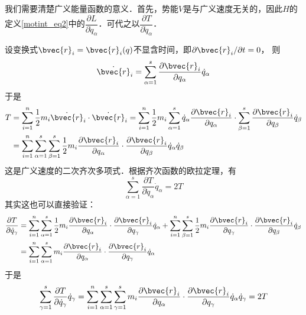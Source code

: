 我们需要清楚广义能量函数的意义．首先，势能$V$是与广义速度无关的，因此$H$的定义\autoref{motint_eq2}中的$\dfrac{\partial L}{\partial \dot q_\alpha}$．可代之以$\dfrac{\partial T}{\partial \dot q_\alpha}$．

设变换式$\bvec{r}_{i}=\bvec{r}_{i}(q)$不显含时间，即$\partial \bvec{r}_{i} / \partial t=0$， 则
\begin{equation}
\dot{\bvec{r}}_{i}=\sum_{\alpha=1}^{s} \frac{\partial \bvec{r}_{i}}{\partial q_{\alpha}} \dot{q}_{\alpha}
\end{equation}
于是
\begin{equation}
\begin{aligned} T &=\sum_{i=1}^{n} \frac{1}{2} m_{i} \dot{\bvec{r}}_{i} \cdot \dot{\bvec{r}}_{i}=\sum_{i=1}^{n} \frac{1}{2} m_{i} \sum_{\alpha=1}^{s} \dot{q}_{\alpha} \frac{\partial \bvec{r}_{i}}{\partial q_{\alpha}} \cdot \sum_{\beta=1}^{s} \frac{\partial \bvec{r}_{i}}{\partial q_{\beta}} \dot{q}_{\beta} \\ &=\sum_{i=1}^{n} \sum_{\alpha=1}^{s} \sum_{\beta=1}^{s} \frac{1}{2} m_{i} \frac{\partial \bvec{r}_{i}}{\partial q_{\alpha}} \cdot \frac{\partial \bvec{r}_{i}}{\partial q_{\beta}} \dot{q}_{\alpha} \dot{q}_{\beta} \end{aligned}
\end{equation}
这是广义速度的二次齐次多项式．根据齐次函数的欧拉定理，有
\begin{equation} \label{motint_eq3}
\sum_{\alpha=1}^{s} \frac{\partial T}{\partial \dot{q}_{\alpha}} \dot{q}_{\alpha}=2 T
\end{equation}
其实这也可以直接验证：
\begin{equation}
\begin{aligned} \frac{\partial T}{\partial \dot{q}_{\gamma}} &=\sum_{i=1}^{n} \sum_{\alpha=1}^{s} \frac{1}{2} m_{i} \frac{\partial \bvec{r}_{i}}{\partial q_{\alpha}} \cdot \frac{\partial \bvec{r}_{i}}{\partial q_{\gamma}} \dot{q}_{\alpha}+\sum_{i=1}^{n} \sum_{\beta=1}^{s} \frac{1}{2} m_{i} \frac{\partial \bvec{r}_{i}}{\partial q_{\gamma}} \cdot \frac{\partial \bvec{r}_{i}}{\partial q_{\beta}} \dot{q}_{\beta} \\ &=\sum_{i=1}^{n} \sum_{\alpha=1}^{s} m_{i} \frac{\partial \bvec{r}_{i}}{\partial q_{\alpha}} \cdot \frac{\partial \bvec{r}_{i}}{\partial q_{\gamma}} \dot{q}_{\alpha} \end{aligned}
\end{equation}
于是
\begin{equation}
\sum_{\gamma=1}^{s} \frac{\partial T}{\partial \dot{q}_{\gamma}} \dot{q}_{\gamma}=\sum_{i=1}^{n} \sum_{\alpha=1}^{s} \sum_{\gamma=1}^{s} m_{i} \frac{\partial \bvec{r}_{i}}{\partial q_{\alpha}} \cdot \frac{\partial \bvec{r}_{i}}{\partial q_{\gamma}} \dot{q}_{\alpha} \dot{q}_{\gamma}=2 T
\end{equation}

